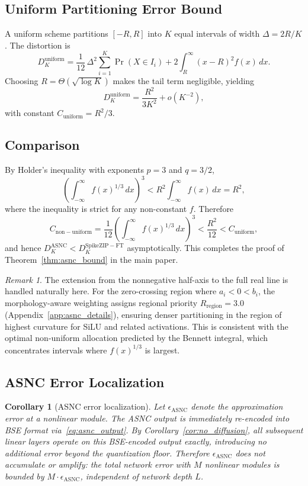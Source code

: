 \documentclass{article}
\theoremstyle{plain}
\newtheorem{corollary}[theorem]{Corollary}
\theoremstyle{definition}
\theoremstyle{remark}
\newtheorem{remark}[theorem]{Remark}
\begin{document}
\subsection{Uniform Partitioning Error Bound}

A uniform scheme partitions $[-R, R]$ into $K$ equal intervals of width $\Delta =
2R/K$. The distortion is
\[
D_K^{\mathrm{uniform}}
= \frac{1}{12}\,\Delta^2 \sum_{i=1}^K \Pr(X \in I_i)
  + 2\int_R^\infty (x-R)^2 f(x)\,dx.
\]
Choosing $R = \Theta(\sqrt{\log K})$ makes the tail term negligible, yielding
\[
D_K^{\mathrm{uniform}}
= \frac{R^2}{3K^2} + o(K^{-2}),
\]
with constant $C_{\mathrm{uniform}} = R^2/3$.

\subsection{Comparison}

By Holder's inequality with exponents $p = 3$ and $q = 3/2$,
\[
\left(\int_{-\infty}^{\infty} f(x)^{1/3}\,dx\right)^3
< R^2 \int_{-\infty}^{\infty} f(x)\,dx = R^2,
\]
where the inequality is strict for any non-constant $f$. Therefore
\[
C_{\mathrm{non-uniform}}
= \frac{1}{12}\left(\int_{-\infty}^{\infty} f(x)^{1/3}\,dx\right)^3
< \frac{R^2}{12}
< C_{\mathrm{uniform}},
\]
and hence $D_K^{\mathrm{ASNC}} < D_K^{\mathrm{SpikeZIP-FT}}$ asymptotically. This
completes the proof of Theorem~\ref{thm:asnc_bound} in the main paper.

\begin{remark}
The extension from the nonnegative half-axis to the full real line is handled
naturally here. For the zero-crossing region where $a_i < 0 < b_i$, the
morphology-aware weighting assigns regional priority $R_{\mathrm{region}} = 3.0$
(Appendix~\ref{app:asnc_details}), ensuring denser partitioning in the region of
highest curvature for SiLU and related activations. This is consistent with the
optimal non-uniform allocation predicted by the Bennett integral, which concentrates
intervals where $f(x)^{1/3}$ is largest.
\end{remark}

\subsection{ASNC Error Localization}
\label{app:error_localization}

\begin{corollary}[ASNC error localization]
\label{cor:asnc_localization}
Let $\epsilon_{\mathrm{ASNC}}$ denote the approximation error at a nonlinear module.
The ASNC output is immediately re-encoded into BSE format
via~\eqref{eq:asnc_output}. By Corollary~\ref{cor:no_diffusion}, all subsequent
linear layers operate on this BSE-encoded output exactly, introducing no additional
error beyond the quantization floor. Therefore $\epsilon_{\mathrm{ASNC}}$ does not
accumulate or amplify: the total network error with $M$ nonlinear modules is bounded
by $M \cdot \epsilon_{\mathrm{ASNC}}$, independent of network depth $L$.
\end{corollary}
\end{document}
